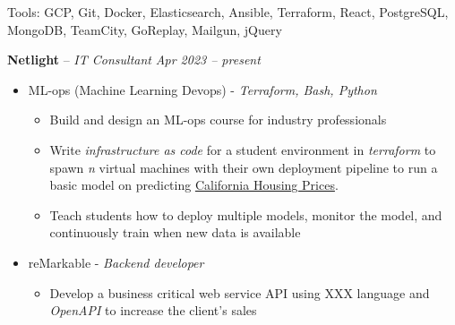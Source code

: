 \documentclass[10pt,letterpaper]{article}
\begin{document}

\inlineheadsection
{Tools:}
{GCP, Git, Docker, Elasticsearch, Ansible, Terraform, React, PostgreSQL, MongoDB, TeamCity, GoReplay, Mailgun, jQuery}
\vspace{0.5em}


\spacedhrule{1em}{-1em}







\headedsection
{\textbf{Netlight} -- \textit{IT Consultant}}
{\textit{Apr 2023 -- present}} {
	\begin{itemize}[noitemsep,nolistsep]
		\item ML-ops (Machine Learning Devops) - {\it Terraform, Bash, Python}
			\begin{itemize}[noitemsep,nolistsep]
				\item Build and design an ML-ops course for industry professionals
				\item Write {\it infrastructure as code} for a student environment in {\it terraform} to spawn {\it n} virtual machines with their own deployment pipeline to run a basic model on predicting \href{https://www.kaggle.com/datasets/camnugent/california-housing-prices}{California Housing Prices}.
				\item Teach students how to deploy multiple models, monitor the model, and continuously train when new data is available
			\end{itemize}
		\item reMarkable - {\it Backend developer}
			\begin{itemize}[noitemsep,nolistsep]
				\item Develop a business critical web service API using XXX language and {\it OpenAPI} to increase the client's sales
			\end{itemize}
	\end{itemize}
}
\vspace{-1mm}
\end{document}

